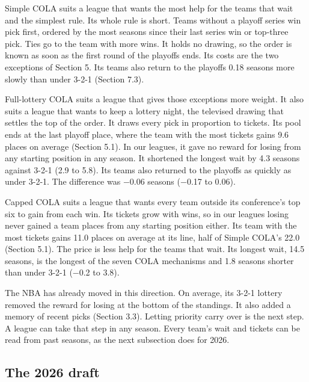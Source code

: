 \documentclass[11pt,letterpaper]{article}
\begin{document}
Simple COLA suits a league that wants the most help for the teams that wait and the simplest rule. Its whole rule is short. Teams without a playoff series win pick first, ordered by the most seasons since their last series win or top-three pick. Ties go to the team with more wins. It holds no drawing, so the order is known as soon as the first round of the playoffs ends. Its costs are the two exceptions of Section 5. Its teams also return to the playoffs 0.18 seasons more slowly than under 3-2-1 (Section 7.3).

Full-lottery COLA suits a league that gives those exceptions more weight. It also suits a league that wants to keep a lottery night, the televised drawing that settles the top of the order. It draws every pick in proportion to tickets. Its pool ends at the last playoff place, where the team with the most tickets gains 9.6 places on average (Section 5.1). In our leagues, it gave no reward for losing from any starting position in any season. It shortened the longest wait by 4.3 seasons against 3-2-1 (2.9 to 5.8). Its teams also returned to the playoffs as quickly as under 3-2-1. The difference was −0.06 seasons (−0.17 to 0.06).

Capped COLA suits a league that wants every team outside its conference's top six to gain from each win. Its tickets grow with wins, so in our leagues losing never gained a team places from any starting position either. Its team with the most tickets gains 11.0 places on average at its line, half of Simple COLA's 22.0 (Section 5.1). The price is less help for the teams that wait. Its longest wait, 14.5 seasons, is the longest of the seven COLA mechanisms and 1.8 seasons shorter than under 3-2-1 (−0.2 to 3.8).

The NBA has already moved in this direction. On average, its 3-2-1 lottery removed the reward for losing at the bottom of the standings. It also added a memory of recent picks (Section 3.3). Letting priority carry over is the next step. A league can take that step in any season. Every team's wait and tickets can be read from past seasons, as the next subsection does for 2026.

\subsection{The 2026 draft}
\end{document}
